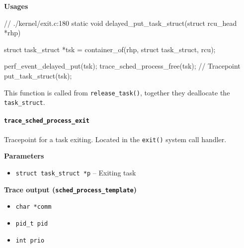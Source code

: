 \textbf{Usages}
\begin{code}
// ./kernel/exit.c:180
static void delayed_put_task_struct(struct rcu_head *rhp){
	struct task_struct *tsk = container_of(rhp, struct task_struct, rcu);

	perf_event_delayed_put(tsk);
	trace_sched_process_free(tsk); // Tracepoint
	put_task_struct(tsk);
}
\end{code}
This function is called from \verb|release_task()|, together they deallocate the \verb|task_struct|.
  
\paragraph{\texttt{trace\_sched\_process\_exit}}
Tracepoint for a task exiting. Located in the \verb|exit()| system call handler.

\textbf{Parameters}
\begin{itemize}
    \item \verb|struct task_struct *p| -- Exiting task
\end{itemize}

\textbf{Trace output (\texttt{sched\_process\_template})}
\begin{itemize}
    \item \verb|char *comm|
    \item \verb|pid_t pid|
    \item \verb|int prio|
\end{itemize}


